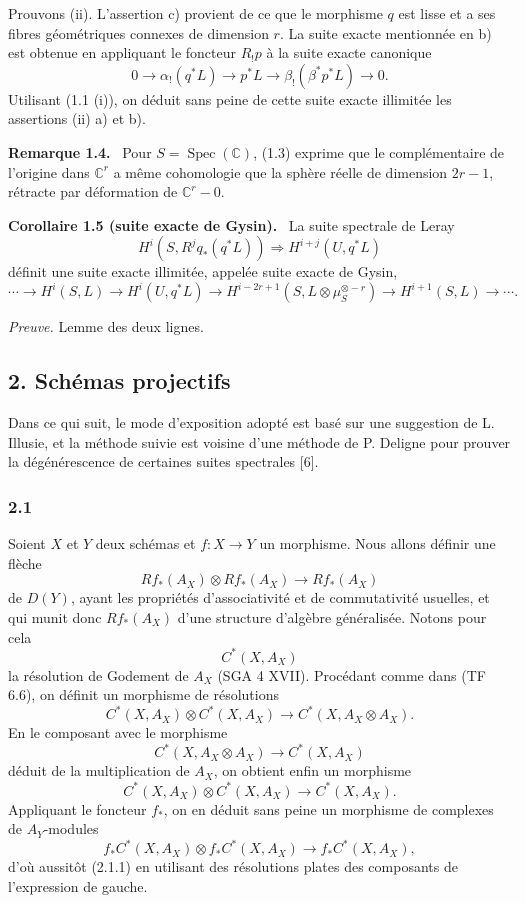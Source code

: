 \documentclass[11pt]{article}
\newenvironment{statement}[1]{\par\medskip\noindent\textbf{#1.}\ }{\par\medskip}
\begin{document}
Prouvons (ii). L'assertion c) provient de ce que le morphisme $q$ est lisse et a ses fibres géométriques connexes de dimension $r$. La suite exacte mentionnée en b) est obtenue en appliquant le foncteur $R_!p$ à la suite exacte canonique
\[
0\longrightarrow \alpha_!(q^*L)\longrightarrow p^*L\longrightarrow \beta_!(\beta^*p^*L)\longrightarrow 0.
\]
Utilisant (1.1 (i)), on déduit sans peine de cette suite exacte illimitée les assertions (ii) a) et b).

\begin{statement}{Remarque 1.4}
Pour $S=\operatorname{Spec}(\mathbb C)$, (1.3) exprime que le complémentaire de l'origine dans $\mathbb C^r$ a même cohomologie que la sphère réelle de dimension $2r-1$, rétracte par déformation de $\mathbb C^r-0$.
\end{statement}

\begin{statement}{Corollaire 1.5 (suite exacte de Gysin)}
La suite spectrale de Leray
\[
H^i(S,R^j q_*(q^*L))\Rightarrow H^{i+j}(U,q^*L)
\]
définit une suite exacte illimitée, appelée suite exacte de Gysin,
\[
\cdots\longrightarrow H^i(S,L)\longrightarrow H^i(U,q^*L)\longrightarrow
H^{i-2r+1}(S,L\otimes\mu_S^{\otimes -r})\longrightarrow H^{i+1}(S,L)\longrightarrow\cdots.
\]
\end{statement}

\emph{Preuve.} Lemme des deux lignes.

\subsection*{2. Schémas projectifs}

Dans ce qui suit, le mode d'exposition adopté est basé sur une suggestion de L. Illusie, et la méthode suivie est voisine d'une méthode de P. Deligne pour prouver la dégénérescence de certaines suites spectrales [6].

\subsubsection*{2.1}
Soient $X$ et $Y$ deux schémas et $f:X\to Y$ un morphisme. Nous allons définir une flèche
\[
Rf_*(A_X)\otimes Rf_*(A_X)\longrightarrow Rf_*(A_X)
\tag{2.1.1}
\]
de $D(Y)$, ayant les propriétés d'associativité et de commutativité usuelles, et qui munit donc $Rf_*(A_X)$ d'une structure d'algèbre généralisée. Notons pour cela
\[
C^*(X,A_X)
\]
la résolution de Godement de $A_X$ (SGA 4 XVII). Procédant comme dans (TF 6.6), on définit un morphisme de résolutions
\[
C^*(X,A_X)\otimes C^*(X,A_X)\longrightarrow C^*(X,A_X\otimes A_X).
\]
En le composant avec le morphisme
\[
C^*(X,A_X\otimes A_X)\longrightarrow C^*(X,A_X)
\]
déduit de la multiplication de $A_X$, on obtient enfin un morphisme
\[
C^*(X,A_X)\otimes C^*(X,A_X)\longrightarrow C^*(X,A_X).
\tag{2.1.2}
\]
Appliquant le foncteur $f_*$, on en déduit sans peine un morphisme de complexes de $A_Y$-modules
\[
f_*C^*(X,A_X)\otimes f_*C^*(X,A_X)\longrightarrow f_*C^*(X,A_X),
\]
d'où aussitôt (2.1.1) en utilisant des résolutions plates des composants de l'expression de gauche.
\end{document}

